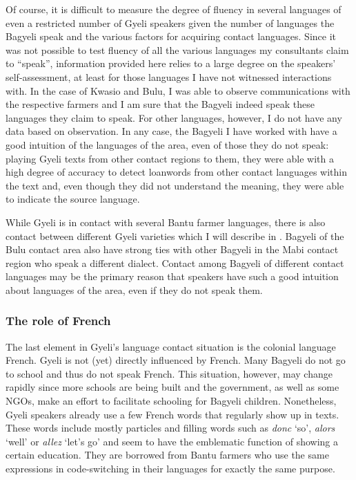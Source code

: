 Of course, it is difficult to measure the degree of fluency in several languages of even a restricted number of Gyeli speakers given the number of languages the Bagyeli speak and the various factors for acquiring contact languages. Since it was not possible to test fluency of all the various languages my consultants claim to ``speak'', information provided here relies to a large degree on the speakers' self-assessment, at least for those languages I have not witnessed interactions with. In the case of Kwasio and Bulu, I was able to observe communications with the respective farmers and I am sure that the Bagyeli indeed speak these languages they claim to speak. For other languages, however, I do not have any data based on observation. In any case, the Bagyeli I have worked with have a good intuition of the languages of the area, even of those they do not speak: playing Gyeli texts from other contact regions to them, they were able with a high degree of accuracy to detect loanwords from other contact languages within the text and, even though they did not understand the meaning, they were able to indicate the source language. 


While Gyeli is in contact with several Bantu farmer languages, there is also contact between  different Gyeli varieties which I will describe in . Bagyeli of the Bulu contact area also have strong ties with other Bagyeli in the Mabi contact region who speak a different dialect. Contact among Bagyeli of different contact languages may be the primary reason that speakers have such a good intuition about languages of the area, even if they do not speak them.


\subsubsection{The role of French} 
The last element in Gyeli's language contact situation is the colonial language French. Gyeli is not (yet) directly influenced by French. Many Bagyeli do not go to school and thus do not speak French. This situation, however, may change rapidly since more schools are being built and the government, as well as some NGOs, make an effort to facilitate schooling for Bagyeli children. Nonetheless, Gyeli speakers already use a few French words that regularly show up in texts. These  words include mostly particles and filling words such as {\itshape donc} `so', {\itshape alors} `well' or {\itshape allez} `let's go' and seem to have the emblematic function of showing a certain education. They are borrowed from Bantu farmers who use the same expressions in code-switching in their languages for exactly the same purpose.

